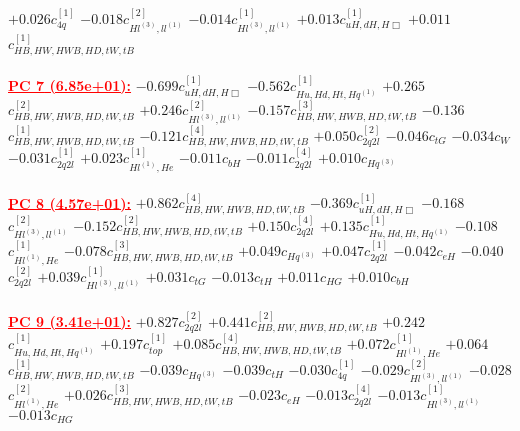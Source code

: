 \documentclass{article}
\begin{document}
{$+0.026$}{\rm $c_{4q}^{[1]}$} 
{$-0.018$}{\rm $c_{Hl^{(3)},ll^{(1)}}^{[2]}$} 
{$-0.014$}{\rm $c_{Hl^{(3)},ll^{(1)}}^{[1]}$} 
{$+0.013$}{\rm $c_{uH,dH,H\Box}^{[1]}$} 
{$+0.011$}{\rm $c_{HB,HW,HWB,HD,tW,tB}^{[1]}$} 
 \nonumber \\ \nonumber \\ 
\noindent \textcolor{red}{\underline{\bf{PC 7} (6.85e+01):}}
{$-0.699$}{\rm $c_{uH,dH,H\Box}^{[1]}$} 
{$-0.562$}{\rm $c_{Hu,Hd,Ht,Hq^{(1)}}^{[1]}$} 
{$+0.265$}{\rm $c_{HB,HW,HWB,HD,tW,tB}^{[2]}$} 
{$+0.246$}{\rm $c_{Hl^{(3)},ll^{(1)}}^{[2]}$} 
{$-0.157$}{\rm $c_{HB,HW,HWB,HD,tW,tB}^{[3]}$} 
{$-0.136$}{\rm $c_{HB,HW,HWB,HD,tW,tB}^{[1]}$} 
{$-0.121$}{\rm $c_{HB,HW,HWB,HD,tW,tB}^{[4]}$} 
{$+0.050$}{\rm $c_{2q2l}^{[2]}$} 
{$-0.046$}{\rm $c_{tG}$} 
{$-0.034$}{\rm $c_{W}$} 
{$-0.031$}{\rm $c_{2q2l}^{[1]}$} 
{$+0.023$}{\rm $c_{Hl^{(1)},He}^{[1]}$} 
{$-0.011$}{\rm $c_{bH}$} 
{$-0.011$}{\rm $c_{2q2l}^{[4]}$} 
{$+0.010$}{\rm $c_{Hq^(3)}$} 
 \nonumber \\ \nonumber \\ 
\noindent \textcolor{red}{\underline{\bf{PC 8} (4.57e+01):}}
{$+0.862$}{\rm $c_{HB,HW,HWB,HD,tW,tB}^{[4]}$} 
{$-0.369$}{\rm $c_{uH,dH,H\Box}^{[1]}$} 
{$-0.168$}{\rm $c_{Hl^{(3)},ll^{(1)}}^{[2]}$} 
{$-0.152$}{\rm $c_{HB,HW,HWB,HD,tW,tB}^{[2]}$} 
{$+0.150$}{\rm $c_{2q2l}^{[4]}$} 
{$+0.135$}{\rm $c_{Hu,Hd,Ht,Hq^{(1)}}^{[1]}$} 
{$-0.108$}{\rm $c_{Hl^{(1)},He}^{[1]}$} 
{$-0.078$}{\rm $c_{HB,HW,HWB,HD,tW,tB}^{[3]}$} 
{$+0.049$}{\rm $c_{Hq^(3)}$} 
{$+0.047$}{\rm $c_{2q2l}^{[1]}$} 
{$-0.042$}{\rm $c_{eH}$} 
{$-0.040$}{\rm $c_{2q2l}^{[2]}$} 
{$+0.039$}{\rm $c_{Hl^{(3)},ll^{(1)}}^{[1]}$} 
{$+0.031$}{\rm $c_{tG}$} 
{$-0.013$}{\rm $c_{tH}$} 
{$+0.011$}{\rm $c_{HG}$} 
{$+0.010$}{\rm $c_{bH}$} 
 \nonumber \\ \nonumber \\ 
\noindent \textcolor{red}{\underline{\bf{PC 9} (3.41e+01):}}
{$+0.827$}{\rm $c_{2q2l}^{[2]}$} 
{$+0.441$}{\rm $c_{HB,HW,HWB,HD,tW,tB}^{[2]}$} 
{$+0.242$}{\rm $c_{Hu,Hd,Ht,Hq^{(1)}}^{[1]}$} 
{$+0.197$}{\rm $c_{top}^{[1]}$} 
{$+0.085$}{\rm $c_{HB,HW,HWB,HD,tW,tB}^{[4]}$} 
{$+0.072$}{\rm $c_{Hl^{(1)},He}^{[1]}$} 
{$+0.064$}{\rm $c_{HB,HW,HWB,HD,tW,tB}^{[1]}$} 
{$-0.039$}{\rm $c_{Hq^(3)}$} 
{$-0.039$}{\rm $c_{tH}$} 
{$-0.030$}{\rm $c_{4q}^{[1]}$} 
{$-0.029$}{\rm $c_{Hl^{(3)},ll^{(1)}}^{[2]}$} 
{$-0.028$}{\rm $c_{Hl^{(1)},He}^{[2]}$} 
{$+0.026$}{\rm $c_{HB,HW,HWB,HD,tW,tB}^{[3]}$} 
{$-0.023$}{\rm $c_{eH}$} 
{$-0.013$}{\rm $c_{2q2l}^{[4]}$} 
{$-0.013$}{\rm $c_{Hl^{(3)},ll^{(1)}}^{[1]}$} 
{$-0.013$}{\rm $c_{HG}$} 
 \nonumber \\ \nonumber \\ 
\end{document}
